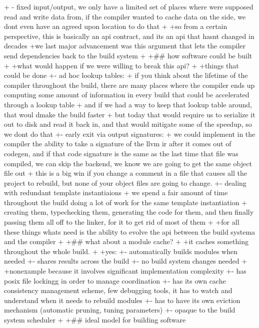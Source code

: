 +  - fixed input/output, we only have a limited set of places where were supposed read and write data from, if the compiler wanted to cache data on the side, we dont even have an agreed upon location to do that
+
+so from a certain perspective, this is basically an api contract, and its an api that hasnt changed in decades
+we last major advancement was this argument that lets the compiler send dependencies back to the build system
+
+## how software could be built
+
+what would happen if we were willing to break this api?
+
+things that could be done
+- ad hoc lookup tables:
+  if you think about the lifetime of the compiler throughout the build, there are many places where the compiler ends
up computing some amount of information in every build that could be accelerated through a lookup table
+  and if we had a way to keep that lookup table around, that woul dmake the build faster
+  but today that would require us to serialize it out to disk and read it back in, and that would mitigate some of the speedup, so we dont do that
+- early exit via output signatures:
+  we could implement in the compiler the ability to take a signature of the llvm ir after it comes out of codegen, and if that code signature is the same as the last time that file was compiled, we can skip the backend, we know we are going to get the same object file out
+  this is a big win if you change a comment in a file that causes all the project to rebuild, but none of your object
files are going to change.
+- dealing with redundant template instantiaions
+  we spend a fair amount of time throughout the build doing a lot of work for the same template instantiation
+  creating them, typechecking them, generating the code for them, and then finally passing them all off to the linker, for it to get rid of most of them
+
+for all these things whats need is the ability to evolve the api between the build systema and the compiler
+
+## what about a module cache?
+
+it caches something throughout the whole build.
+
+yes:
+- automatically builds modules when needed
+- shares results across the build
+- no build system changes needed
+
+nonexample because it involves significant implementation complexity
+- has posix file lockingg in order to manage coordination
+- has its own cache consistency management scheme, few debugging tools, it has to watch and understand when it needs to rebuild modules
+- has to have its own eviction mechanism (automatic pruning, tuning parameters)
+- opaque to the build system scheduler
+
+## ideal model for building software



